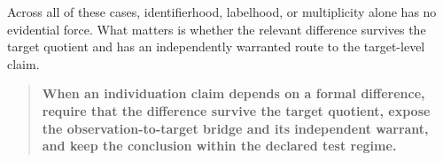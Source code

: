 \documentclass[12pt]{article}
\begin{document}
Across all of these cases, identifierhood, labelhood, or multiplicity alone has no evidential force. What matters is whether the relevant difference survives the target quotient and has an independently warranted route to the target-level claim.

\begin{quote}
\textbf{When an individuation claim depends on a formal difference, require that the difference survive the target quotient, expose the observation-to-target bridge and its independent warrant, and keep the conclusion within the declared test regime.}
\end{quote}

\clearpage


\end{document}
